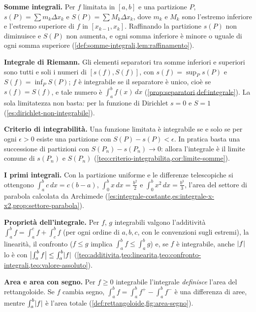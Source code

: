 \begin{puntichiave}
\item \textbf{Somme integrali.} Per $f$ limitata in $[a,b]$ e una partizione $P$,
$s(P)=\sum m_{k}\Delta x_{k}$ e $S(P)=\sum M_{k}\Delta x_{k}$, dove $m_{k}$ e $M_{k}$
sono l'estremo inferiore e l'estremo superiore di $f$ in $[x_{k-1},x_{k}]$.
Raffinando la partizione $s(P)$ non diminuisce e $S(P)$ non aumenta, e ogni somma
inferiore è minore o uguale di ogni somma superiore
(\cref{def:somme-integrali,lem:raffinamento}).
\item \textbf{Integrale di Riemann.} Gli elementi separatori tra somme inferiori e
superiori sono tutti e soli i numeri di $[s(f),S(f)]$, con $s(f)=\sup_{P}s(P)$ e
$S(f)=\inf_{P}S(P)$; $f$ è integrabile se il separatore è unico, cioè se $s(f)=S(f)$, e
tale numero è $\int_{a}^{b}f(x)\,dx$ (\cref{prop:separatori,def:integrale}). La sola
limitatezza non basta: per la funzione di Dirichlet $s=0$ e $S=1$
(\cref{es:dirichlet-non-integrabile}).
\item \textbf{Criterio di integrabilità.} Una funzione limitata è integrabile se e solo
se per ogni $\epsilon>0$ esiste una partizione con $S(P)-s(P)<\epsilon$. In pratica
basta una successione di partizioni con $S(P_{n})-s(P_{n})\to0$: allora l'integrale è
il limite comune di $s(P_{n})$ e $S(P_{n})$
(\cref{teo:criterio-integrabilita,cor:limite-somme}).
\item \textbf{I primi integrali.} Con la partizione uniforme e le differenze
telescopiche si ottengono $\int_{a}^{b}c\,dx=c(b-a)$, $\int_{0}^{b}x\,dx=\frac{b^{2}}2$ e
$\int_{0}^{b}x^{2}\,dx=\frac{b^{3}}3$, l'area del settore di parabola calcolata da
Archimede (\cref{es:integrale-costante,es:integrale-x-x2,prop:settore-parabola}).
\item \textbf{Proprietà dell'integrale.} Per $f$, $g$ integrabili valgono l'additività
$\int_{a}^{b}f=\int_{a}^{c}f+\int_{c}^{b}f$ (per ogni ordine di $a,b,c$, con le
convenzioni sugli estremi), la linearità, il confronto ($f\le g$ implica
$\int_{a}^{b}f\le\int_{a}^{b}g$) e, se $f$ è integrabile, anche $\lvert f\rvert$ lo è con
$\bigl|\int_{a}^{b}f\bigr|\le\int_{a}^{b}\lvert f\rvert$
(\cref{teo:additivita,teo:linearita,teo:confronto-integrali,teo:valore-assoluto}).
\item \textbf{Area e area con segno.} Per $f\ge0$ integrabile l'integrale
\emph{definisce} l'area del rettangoloide. Se $f$ cambia segno,
$\int_{a}^{b}f=\int_{a}^{b}f^{+}-\int_{a}^{b}f^{-}$ è una differenza di aree, mentre
$\int_{a}^{b}\lvert f\rvert$ è l'area totale (\cref{def:rettangoloide,fig:area-segno}).

\end{puntichiave}
